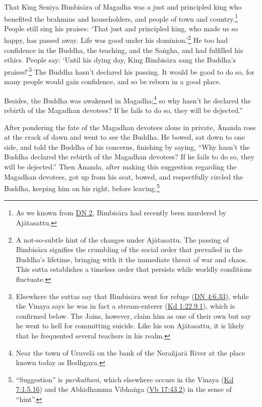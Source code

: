 \documentclass[12pt,openany]{book}%
\begin{document}
That King Seniya \textsanskrit{Bimbisāra} of Magadha was a just and principled king who benefited the brahmins and householders, and people of town and country.\footnote{As we known from \href{https://suttacentral.net/dn2/en/sujato}{DN 2}, \textsanskrit{Bimbisāra} had recently been murdered by \textsanskrit{Ajātasattu}. } People still sing his praises: ‘That just and principled king, who made us so happy, has passed away. Life was good under his dominion.’\footnote{A not-so-subtle hint of the changes under \textsanskrit{Ajātasattu}. The passing of \textsanskrit{Bimbisāra} signifies the crumbling of the social order that prevailed in the Buddha’s lifetime, bringing with it the immediate threat of war and chaos. This sutta establishes a timeless order that persists while worldly conditions fluctuate. } He too had confidence in the Buddha, the teaching, and the \textsanskrit{Saṅgha}, and had fulfilled his ethics. People say: ‘Until his dying day, King \textsanskrit{Bimbisāra} sang the Buddha’s praises!’\footnote{Elsewhere the suttas say that \textsanskrit{Bimbisāra} went for refuge (\href{https://suttacentral.net/dn4/en/sujato\#6.33}{DN 4:6.33}), while the Vinaya says he was in fact a stream-enterer (\href{https://suttacentral.net/pli-tv-kd1/en/sujato\#22.9.1}{Kd 1:22.9.1}), which is confirmed below. The Jains, however, claim him as one of their own but say he went to hell for committing suicide. Like his son \textsanskrit{Ajātasattu}, it is likely that he frequented several teachers in his realm. } The Buddha hasn’t declared his passing. It would be good to do so, for many people would gain confidence, and so be reborn in a good place. 

Besides, the Buddha was awakened in Magadha;\footnote{Near the town of  \textsanskrit{Uruvelā} on the bank of the \textsanskrit{Nerañjarā} River at the place known today as Bodhgaya. } so why hasn’t he declared the rebirth of the Magadhan devotees? If he fails to do so, they will be dejected.” 

After pondering the fate of the Magadhan devotees alone in private, Ānanda rose at the crack of dawn and went to see the Buddha. He bowed, sat down to one side, and told the Buddha of his concerns, finishing by saying, “Why hasn’t the Buddha declared the rebirth of the Magadhan devotees? If he fails to do so, they will be dejected.” Then Ānanda, after making this suggestion regarding the Magadhan devotees, got up from his seat, bowed, and respectfully circled the Buddha, keeping him on his right, before leaving.\footnote{“Suggestion” is \textit{\textsanskrit{parikathaṁ}}, which elsewhere occurs in the Vinaya (\href{https://suttacentral.net/pli-tv-kd7/en/sujato\#1.5.16}{Kd 7:1.5.16}) and the Abhidhamma \textsanskrit{Vibhaṅga} (\href{https://suttacentral.net/vb17/en/sujato\#43.2}{Vb 17:43.2}) in the sense of “hint”. } 
\end{document}
